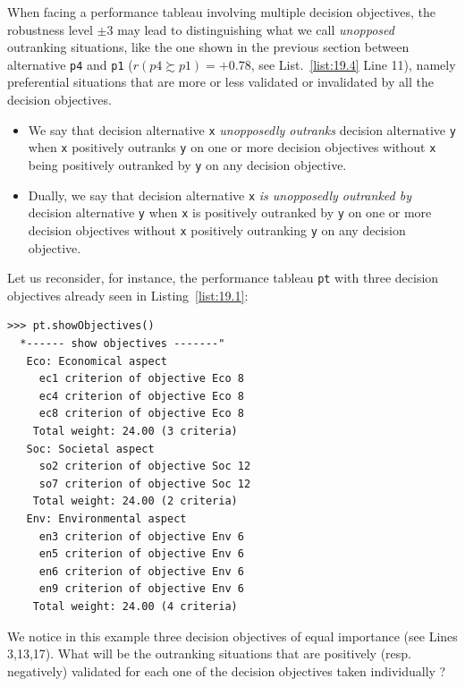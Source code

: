 When facing a performance tableau involving multiple decision objectives, the robustness level $\pm 3$  may lead to distinguishing what we call \emph{unopposed} outranking situations, like the one shown in the previous section between alternative \texttt{p4} and \texttt{p1} ($r(p4 \succsim p1) = +0.78$, see List.~\vref{list:19.4} Line 11), namely preferential situations that are more or less validated or invalidated by all the decision objectives.  
\begin{definition}\label{def:19.2}
\begin{itemize}
\item We say that decision alternative \texttt{x} \emph{unopposedly outranks} decision alternative \texttt{y} when  \texttt{x} positively outranks \texttt{y} on one or more decision objectives without \texttt{x} being positively outranked by \texttt{y} on any decision objective.
\item Dually, we say that decision alternative \texttt{x} \emph{is unopposedly outranked by} decision alternative \texttt{y} when \texttt{x} is positively outranked by \texttt{y} on one or more decision objectives without \texttt{x} positively outranking \texttt{y} on any decision objective.
\end{itemize}
\end{definition}

Let us reconsider, for instance, the performance tableau \texttt{pt} with three decision objectives already seen in Listing~\vref{list:19.1}:
\begin{lstlisting}
>>> pt.showObjectives()
  *------ show objectives -------"
   Eco: Economical aspect
     ec1 criterion of objective Eco 8
     ec4 criterion of objective Eco 8
     ec8 criterion of objective Eco 8
    Total weight: 24.00 (3 criteria)
   Soc: Societal aspect
     so2 criterion of objective Soc 12
     so7 criterion of objective Soc 12
    Total weight: 24.00 (2 criteria)
   Env: Environmental aspect
     en3 criterion of objective Env 6
     en5 criterion of objective Env 6
     en6 criterion of objective Env 6
     en9 criterion of objective Env 6
    Total weight: 24.00 (4 criteria)
\end{lstlisting}
We notice in this example three decision objectives of equal importance (see Lines 3,13,17). What will be the outranking situations that are positively (resp.  negatively) validated for each one of the decision objectives taken individually ?

